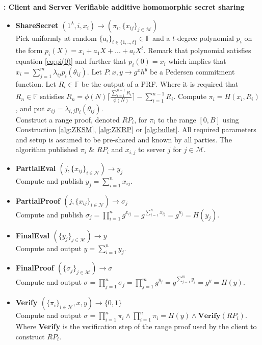 \begin{algorithm}[H]
\caption{\textbf{: Client and Server Verifiable additive homomorphic secret sharing}}
\begin{itemize}
  \item\textbf{ShareSecret $(1^\lambda,i,x_i)\xrightarrow[]{}(\pi_i,\{x_{ij}\}_{j\in\mathcal{M}})$}\\
Pick uniformly at random $\{a_i\}_{i\in\{1,..,t\}}\in\mathds{F}$ and a $t$-degree polynomial $p_i$ on the form $p_i(X) = x_i + a_1X+...+a_tX^t$. Remark that polynomial satisfies equation \eqref{eq:pi(0)} and further that $p_i(0)=x_i$  which implies that $x_i =  \sum_{j=1}^m \lambda_{ij}p_i(\theta_{ij})$. 
Let $P : x,y \to g^xh^y$ be a Pedersen commitment function.
 Let $R_i\in\mathds{F}$ be the output of a PRF. Where it is required that  $R_n\in \mathds{F}$  satisfies
$R_n = \phi(N)\lceil \frac{\sum_{i=1}^{n-1}R_i}{\phi(N)}\rceil- \sum_{i=1}^{n-1}R_i $. Compute $\pi_i = H(x_i,R_i)$, and put $x_{ij}=\lambda_{i,j}p_i(\theta_{ij})$. \\
Construct a range proof, denoted $RP_i$, for  $\pi_i$ to the  range $[0,B]$ using Construction \ref{alg:ZKSM}, \ref{alg:ZKRP} or \ref{alg:bullet}. All required  parameters and setup is assumed to be pre-shared and known by all parties.
The algorithm published $\pi_i$ \& $RP_i$ and $x_{i,j}$ to server $j$ for $j\in\mathcal{M}$. 

\item\textbf{PartialEval $(j,\{x_{ij}\}_{i\in\mathcal{N}})\xrightarrow[]{}y_j$}\\
Compute and publish $y_j = \sum_{i=1}^n x_{ij}$.

\item\textbf{PartialProof $(j,\{x_{ij}\}_{i\in\mathcal{N}})\xrightarrow[]{}\sigma_j$}\\
Compute and publish $\sigma_j = \prod_{i=1}^n g^{x_{ij}} =  g^{\sum_{i=1}^n x_{ij}}= g^{y_j}=H(y_j)$.

\item\textbf{FinalEval $(\{y_j\}_{j\in\mathcal{M}})\xrightarrow[]{}y$}\\
Compute and output $y = \sum_{i=1}^n y_{j}$.

\item\textbf{FinalProof $(\{\sigma_j\}_{j\in\mathcal{M}})\xrightarrow[]{}\sigma$}\\
Compute and output $\sigma = \prod_{j=1}^n \sigma_j = \prod_{j=1}^m g^{y_{j}} =  g^{\sum_{j=1}^m y_{j}}= g^{y}=H(y)$.

\item\textbf{Verify $(\{\pi_i\}_{i\in\mathcal{N}},x,y)\xrightarrow[]{}\{0,1\}$}\\
Compute and output $\sigma= \prod_{i=1}^n \pi_i \wedge \prod_{i=1}^n \pi_i = H(y)\wedge \textbf{Verify}(RP_i)$. Where \textbf{Verify} is the verification step of the range proof used by the client to construct $RP_i$.
\end{itemize}
\label{alg:VAHSS-HSS-RP}
\end{algorithm}

